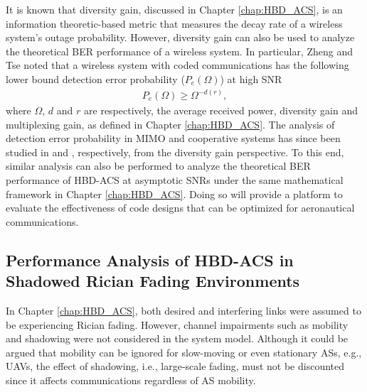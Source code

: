 It is known that diversity gain, discussed in Chapter \ref{chap:HBD_ACS}, is an information theoretic-based metric that measures the decay rate of a wireless system's outage probability. However, diversity gain can also be used to analyze the theoretical BER performance of a wireless system. In particular, Zheng and Tse \cite{zheng2003diversity} noted that a wireless system with coded communications has the following lower bound detection error probability ($P_e(\Omega)$) at high SNR
\begin{eqnarray}  \label{detect_error_lb}
 P_e(\Omega) \geq \Omega^{-d(r)},
\end{eqnarray}
where $\Omega$, $d$ and $r$ are respectively, the average received power, diversity gain and multiplexing gain, as defined in Chapter \ref{chap:HBD_ACS}. The analysis of detection error probability in MIMO and cooperative systems has since been studied in \cite{el2006mimo} and \cite{ishibashi2015diversity}, respectively, from the diversity gain perspective. To this end, similar analysis can also be performed to analyze the theoretical BER performance of HBD-ACS at asymptotic SNRs under the same mathematical framework in Chapter \ref{chap:HBD_ACS}. Doing so will provide a platform to evaluate the effectiveness of code designs that can be optimized for aeronautical communications.

\subsection{Performance Analysis of HBD-ACS in Shadowed Rician Fading Environments}


In Chapter \ref{chap:HBD_ACS}, both desired and interfering links were assumed to be experiencing Rician fading. However, channel impairments such as mobility and shadowing were not considered in the system model. Although it could be argued that mobility can be ignored for slow-moving or even stationary ASs, e.g., UAVs, the effect of shadowing, i.e., large-scale fading, must not be discounted since it affects communications regardless of AS mobility.

